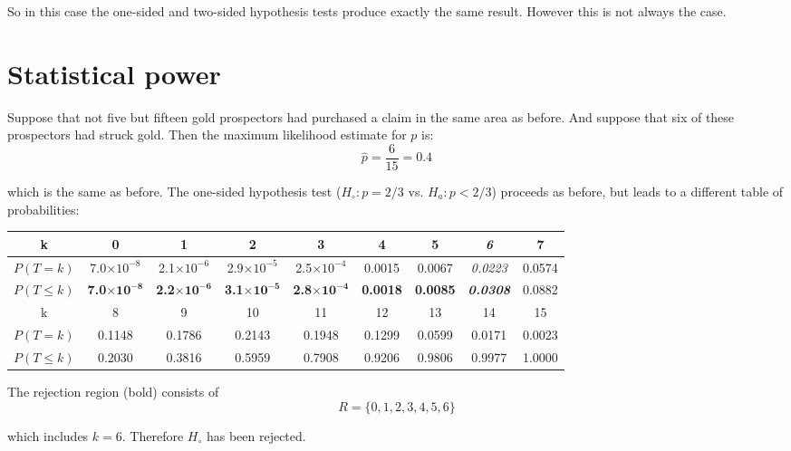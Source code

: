 So in this case the one-sided and two-sided hypothesis tests produce
exactly the same result. However this is not always the case.

\section{Statistical power}
\label{sec:power}

Suppose that not five but fifteen gold prospectors had purchased a
claim in the same area as before. And suppose that six of these
prospectors had struck gold. Then the maximum likelihood estimate for
$p$ is:
\[
\hat{p} = \frac{6}{15} = 0.4
\]

\noindent which is the same as before. The one-sided hypothesis test
($H_\circ: p={2/3}$ vs. $H_a: p<2/3$) proceeds as before, but leads to
a different table of probabilities:

\begin{center}
  \begin{tabular}{c@{\gap}c@{\gap}c@{\gap}c@{\gap}c@{\gap}c@{\gap}c@{\gap}c@{\gap}c}
    k & \textbf{0} & \textbf{1} & \textbf{2} & \textbf{3} & \textbf{4}
    & \textbf{5} & \textbf{\textit{6}} & 7 \\ \hline $P(T=k)$ &
    7.0$\times{10}^{-8}$ & 2.1$\times{10}^{-6}$ & 2.9$\times{10}^{-5}$
    & 2.5$\times{10}^{-4}$ & 0.0015 & 0.0067 & \textit{0.0223} & 0.0574 \\
    $P({T}\leq{k})$ & \textbf{7.0}$\mathbf{\times{10}^{-8}}$
    & \textbf{2.2}$\mathbf{\times{10}^{-6}}$ &
    \textbf{3.1}$\mathbf{\times{10}^{-5}}$ &
    \textbf{2.8}$\mathbf{\times{10}^{-4}}$ & \textbf{0.0018} &
    \textbf{0.0085} & \textbf{\textit{0.0308}} & 0.0882 \\
    k & 8 & 9 & 10 & 11 & 12 & 13 & 14 & 15 \\
    \hline $P(T=k)$ & 0.1148 & 0.1786 & 0.2143
    & 0.1948 & 0.1299 & 0.0599 & 0.0171 & 0.0023 \\
    $P({T}\leq{k})$ & 0.2030 & 0.3816 & 0.5959 & 0.7908 &
    0.9206 & 0.9806 & 0.9977 & 1.0000
  \end{tabular}
\end{center}

The rejection region (bold) consists of
\begin{equation}
  R=\{0,1,2,3,4,5,6\}
  \label{eq:1sidedbinomtest15}
\end{equation}

\noindent which includes $k=6$. Therefore $H_\circ$ has been rejected.

